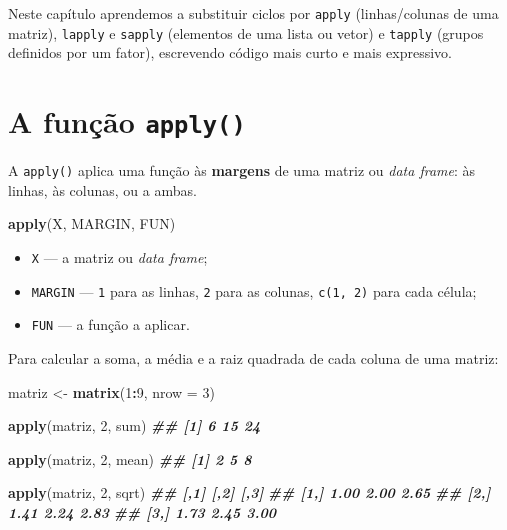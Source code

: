 \documentclass[
  portuguese,
  11pt,
  openany]{book}
\newenvironment{Shaded}{\begin{snugshade}}{\end{snugshade}}
\newcommand{\AttributeTok}[1]{\textcolor[rgb]{0.13,0.29,0.53}{#1}}
\newcommand{\DecValTok}[1]{\textcolor[rgb]{0.00,0.00,0.81}{#1}}
\newcommand{\DocumentationTok}[1]{\textcolor[rgb]{0.56,0.35,0.01}{\textbf{\textit{#1}}}}
\newcommand{\FunctionTok}[1]{\textcolor[rgb]{0.13,0.29,0.53}{\textbf{#1}}}
\newcommand{\NormalTok}[1]{#1}
\newcommand{\OtherTok}[1]{\textcolor[rgb]{0.56,0.35,0.01}{#1}}
\newcommand{\SpecialCharTok}[1]{\textcolor[rgb]{0.81,0.36,0.00}{\textbf{#1}}}
\providecommand{\tightlist}{%
  \setlength{\itemsep}{0pt}\setlength{\parskip}{0pt}}
\begin{document}
Neste capítulo aprendemos a substituir ciclos por \texttt{apply} (linhas/colunas de uma
matriz), \texttt{lapply} e \texttt{sapply} (elementos de uma lista ou vetor) e \texttt{tapply} (grupos
definidos por um fator), escrevendo código mais curto e mais expressivo.

\section{\texorpdfstring{A função \texttt{apply()}}{A função apply()}}\label{a-funuxe7uxe3o-apply}

A \texttt{apply()} aplica uma função às \textbf{margens} de uma matriz ou \emph{data frame}: às linhas,
às colunas, ou a ambas.

\begin{Shaded}
\begin{Highlighting}[]
\FunctionTok{apply}\NormalTok{(X, MARGIN, FUN)}
\end{Highlighting}
\end{Shaded}

\begin{itemize}
\tightlist
\item
  \texttt{X} --- a matriz ou \emph{data frame};
\item
  \texttt{MARGIN} --- \texttt{1} para as linhas, \texttt{2} para as colunas, \texttt{c(1,\ 2)} para cada célula;
\item
  \texttt{FUN} --- a função a aplicar.
\end{itemize}

Para calcular a soma, a média e a raiz quadrada de cada coluna de uma matriz:

\begin{Shaded}
\begin{Highlighting}[]
\NormalTok{matriz }\OtherTok{\textless{}{-}} \FunctionTok{matrix}\NormalTok{(}\DecValTok{1}\SpecialCharTok{:}\DecValTok{9}\NormalTok{, }\AttributeTok{nrow =} \DecValTok{3}\NormalTok{)}

\FunctionTok{apply}\NormalTok{(matriz, }\DecValTok{2}\NormalTok{, sum)}
\DocumentationTok{\#\# [1]  6 15 24}

\FunctionTok{apply}\NormalTok{(matriz, }\DecValTok{2}\NormalTok{, mean)}
\DocumentationTok{\#\# [1] 2 5 8}

\FunctionTok{apply}\NormalTok{(matriz, }\DecValTok{2}\NormalTok{, sqrt)}
\DocumentationTok{\#\#      [,1] [,2] [,3]}
\DocumentationTok{\#\# [1,] 1.00 2.00 2.65}
\DocumentationTok{\#\# [2,] 1.41 2.24 2.83}
\DocumentationTok{\#\# [3,] 1.73 2.45 3.00}
\end{Highlighting}
\end{Shaded}
\end{document}
